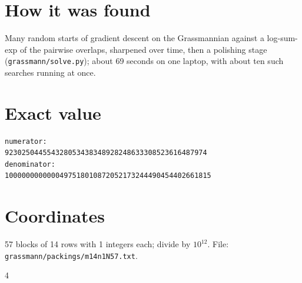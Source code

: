 \documentclass[11pt,a4paper]{article}
\begin{document}
\section{How it was found}
Many random starts of gradient descent on the Grassmannian against a log-sum-exp of the pairwise overlaps, sharpened over time, then a polishing stage (\texttt{grassmann/solve.py}); about 69 seconds on one laptop, with about ten such searches running at once.


\appendix
\section{Exact value}
{\small
\begin{verbatim}
numerator:
923025044554328053438348928248633308523616487974
denominator:
1000000000000497518010872052173244490454402661815
\end{verbatim}}

\section{Coordinates}
57 blocks of 14 rows with 1 integers each; divide by $10^{12}$. File: \texttt{grassmann/packings/m14n1N57.txt}.
{\tiny
\begin{multicols}{4}
\end{multicols}}
\end{document}
